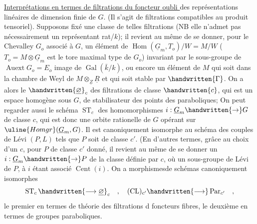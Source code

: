 \uline{Interprétations en termes de filtrations du foncteur oubli } des représentations linéaires de dimension finie de $G$. (Il s'agit de filtrations compatibles au produit tensoriel). Supposons fixé une classe de telles filtrations (NB elle n'admet pas nécessairement un représentant rat/$k$); il revient au même de se donner, pour le Chevalley $G_o$ associé à $G$, un  élément de $\operatorname{Hom}(\underline{G}_m,T_o)/W=M/W$ ($T_o=M\otimes\underline{G}_m$ est le tore maximal type de $G_o$) invariant par le sous-groupe\inserted{\handwritten{$\Gamma$}} de $\operatorname{Auext}G_o=E_o$ image de $\operatorname{Gal}(\bar{k}/k)$, ou encore un  élément de $M$ qui soit dans la chambre de Weyl de $M\otimes_{\underline{Z}}\underline{R}$ et qui soit stable par $\handwritten{\Gamma}$. On a alors le  $\handwritten{\underline{\varnothing}}_c$ des filtrations de classe $\handwritten{c}$, qui est un espace homogène sous $G$, de stabilisateur des points des paraboliques; On peut regarder aussi le schéma $\operatorname{ST}_c$ des homomorphismes $i:\underline{G}_m\handwritten{\to}G$ de classe $c$, qui est donc une orbite rationelle de $G$ opérant sur $\uline{Homgr}(\underline{G}_m,G)$. Il est canoniquement isomorphe au schéma des couples de Lévi $(P,L)$ tels que $P$ soit de classe $c'$. (En d'autres termes, grâce au choix d'un $c$, pour $P$ de classe $c'$ donné, il revient au même de se donner un $i:\underline{G}_m\handwritten{\to}P$ de la classe définie par $c$, où un sous-groupe de Lévi de $P$, à $i$ étant associé $\operatorname{Cent}(i)$.\handwritten{)} On a morphismesde schémas canoniquement isomorphes
\[
\operatorname{ST}_c\handwritten{\longrightarrow\underline{\varnothing}}_c\quad,\quad
(\operatorname{CL})_{c'}\handwritten{\longrightarrow}\operatorname{Par}_{c'}\quad,
\]
le premier en termes de théorie des filtrations d foncteurs fibres, le deuxième en termes de groupes paraboliques.

